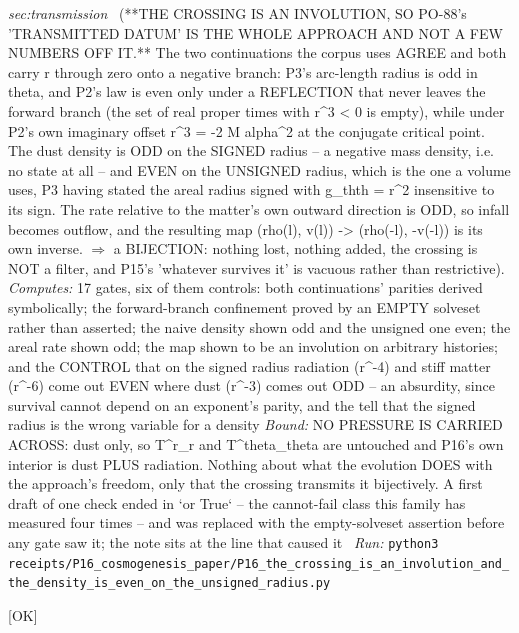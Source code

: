 \begin{description}
\textit{sec:transmission} \ (**THE CROSSING IS AN INVOLUTION, SO PO-88's 'TRANSMITTED DATUM' IS THE WHOLE APPROACH AND NOT A FEW NUMBERS OFF IT.** The two continuations the corpus uses AGREE and both carry r through zero onto a negative branch: P3's arc-length radius is odd in theta, and P2's law is even only under a REFLECTION that never leaves the forward branch (the set of real proper times with r\textasciicircum{}3 < 0 is empty), while under P2's own imaginary offset r\textasciicircum{}3 = -2 M alpha\textasciicircum{}2 at the conjugate critical point. The dust density is ODD on the SIGNED radius -- a negative mass density, i.e. no state at all -- and EVEN on the UNSIGNED radius, which is the one a volume uses, P3 having stated the areal radius signed with g\_thth = r\textasciicircum{}2 insensitive to its sign. The rate relative to the matter's own outward direction is ODD, so infall becomes outflow, and the resulting map (rho(l), v(l)) -> (rho(-l), -v(-l)) is its own inverse. \ensuremath{\Rightarrow} a BIJECTION: nothing lost, nothing added, the crossing is NOT a filter, and P15's 'whatever survives it' is vacuous rather than restrictive). 
\emph{Computes:} 17 gates, six of them controls: both continuations' parities derived symbolically; the forward-branch confinement proved by an EMPTY solveset rather than asserted; the naive density shown odd and the unsigned one even; the areal rate shown odd; the map shown to be an involution on arbitrary histories; and the CONTROL that on the signed radius radiation (r\textasciicircum{}-4) and stiff matter (r\textasciicircum{}-6) come out EVEN where dust (r\textasciicircum{}-3) comes out ODD -- an absurdity, since survival cannot depend on an exponent's parity, and the tell that the signed radius is the wrong variable for a density
 \emph{Bound:}  NO PRESSURE IS CARRIED ACROSS: dust only, so T\textasciicircum{}r\_r and T\textasciicircum{}theta\_theta are untouched and P16's own interior is dust PLUS radiation. Nothing about what the evolution DOES with the approach's freedom, only that the crossing transmits it bijectively.  A first draft of one check ended in `or True` -- the cannot-fail class this family has measured four times -- and was replaced with the empty-solveset assertion before any gate saw it; the note sits at the line that caused it
\ \emph{Run:} \texttt{python3 receipts/P16\_cosmogenesis\_paper/P16\_the\_crossing\_is\_an\_involution\_and\_the\_density\_is\_even\_on\_the\_unsigned\_radius.py}
\item[\rcptlabel{P16_the_crossing_reverses_the_radiation_amplitude_so_it_is_not_species_blind}{P16R6}\textbf{P16R6}\quad\texttt{P16\_the\_crossing\_reverses\_the\_radiation\_amplitude\_so\_it\_is\_not\_species\_blind}]\hfill\textsf{[OK]}\\

\end{description}
